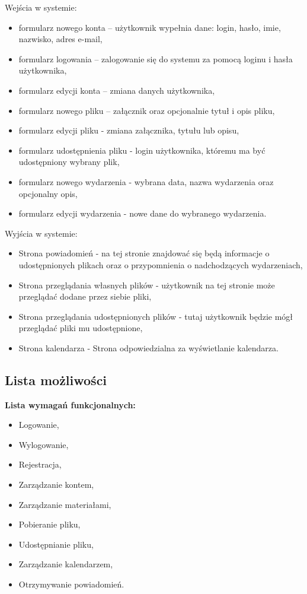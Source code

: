 Wejścia w systemie:
\begin{itemize}
	\item formularz nowego konta – użytkownik wypełnia dane: login, hasło, imie, nazwisko, adres e-mail,
	\item formularz logowania – zalogowanie się do systemu za pomocą loginu i hasła użytkownika,
	\item formularz edycji konta – zmiana danych użytkownika,
	\item formularz nowego pliku – załącznik oraz opcjonalnie tytuł i opis pliku,
	\item formularz edycji pliku - zmiana załącznika, tytułu lub opisu,
	\item formularz udostępnienia pliku - login użytkownika, któremu ma być udostępniony wybrany plik,
	\item formularz nowego wydarzenia - wybrana data, nazwa wydarzenia oraz opcjonalny opis,
	\item formularz edycji wydarzenia - nowe dane do wybranego wydarzenia.
\end{itemize}
Wyjścia w systemie:
\begin{itemize}
	\item Strona powiadomień - na tej stronie znajdować się będą informacje o udostępnionych plikach oraz o przypomnienia o nadchodzących wydarzeniach,
	\item Strona przeglądania własnych plików - użytkownik na tej stronie może przeglądać dodane przez siebie pliki,
	\item Strona przeglądania udostępnionych plików - tutaj użytkownik będzie mógł przeglądać pliki mu udostępnione,
	\item Strona kalendarza - Strona odpowiedzialna za wyświetlanie kalendarza.
\end{itemize}
\subsection{Lista możliwości}
\label{listaFun}
\textbf{Lista wymagań funkcjonalnych:}
\begin{itemize}
	\item Logowanie,
	\item Wylogowanie,
	\item Rejestracja,
	\item Zarządzanie kontem,
	\item Zarządzanie materiałami,
	\item Pobieranie pliku,
	\item Udostępnianie pliku,
	\item Zarządzanie kalendarzem,
	\item Otrzymywanie powiadomień.
\end{itemize}

